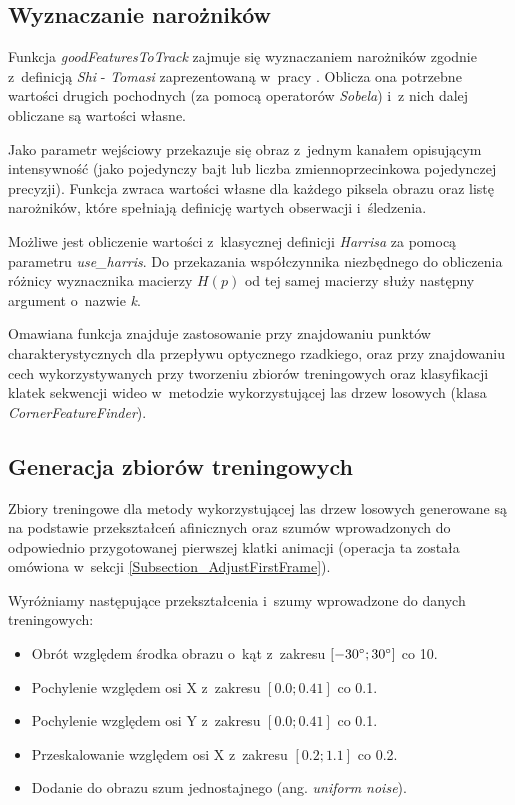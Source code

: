   \subsection{Wyznaczanie narożników}
  Funkcja \textit{goodFeaturesToTrack} zajmuje się wyznaczaniem narożników zgodnie z~definicją \textit{Shi} - \textit{Tomasi} zaprezentowaną w~pracy \cite{GoodFeaturesToTrack94}. Oblicza ona potrzebne wartości drugich pochodnych (za pomocą operatorów \textit{Sobela}) i~z nich dalej obliczane są wartości własne.

  Jako parametr wejściowy przekazuje się obraz z~jednym kanałem opisującym intensywność (jako pojedynczy bajt lub liczba zmiennoprzecinkowa pojedynczej precyzji). Funkcja zwraca wartości własne dla każdego piksela obrazu oraz listę narożników, które spełniają definicję wartych obserwacji i~śledzenia.

  Możliwe jest obliczenie wartości z~klasycznej definicji \textit{Harrisa} za pomocą parametru \textit{use\_harris}. Do przekazania współczynnika niezbędnego do obliczenia różnicy wyznacznika macierzy $H(p)$ od tej samej macierzy służy następny argument o~nazwie \textit{k}.

  Omawiana funkcja znajduje zastosowanie przy znajdowaniu punktów charakterystycznych dla przepływu optycznego rzadkiego, oraz przy znajdowaniu cech wykorzystywanych przy tworzeniu zbiorów treningowych oraz klasyfikacji klatek sekwencji wideo w~metodzie wykorzystującej las drzew losowych (klasa \textit{CornerFeatureFinder}).

  \subsection{Generacja zbiorów treningowych}
  Zbiory treningowe dla metody wykorzystującej las drzew losowych generowane są na podstawie przekształceń afinicznych oraz szumów wprowadzonych do odpowiednio przygotowanej pierwszej klatki animacji (operacja ta została omówiona w~sekcji \ref{Subsection_AdjustFirstFrame}).

  Wyróżniamy następujące przekształcenia i~szumy wprowadzone do danych treningowych:

  \begin{itemize}
    \item Obrót względem środka obrazu o~kąt z~zakresu $[-30^{\circ}\protect; 30^{\circ}\protect]$ co 10\degree.
    \item Pochylenie względem osi X z~zakresu $[0.0; 0.41]$ co 0.1.
    \item Pochylenie względem osi Y z~zakresu $[0.0; 0.41]$ co 0.1.
    \item Przeskalowanie względem osi X z~zakresu $[0.2; 1.1]$ co 0.2.
    \item Dodanie do obrazu szum jednostajnego (ang. \textit{uniform noise}).
  \end{itemize}

